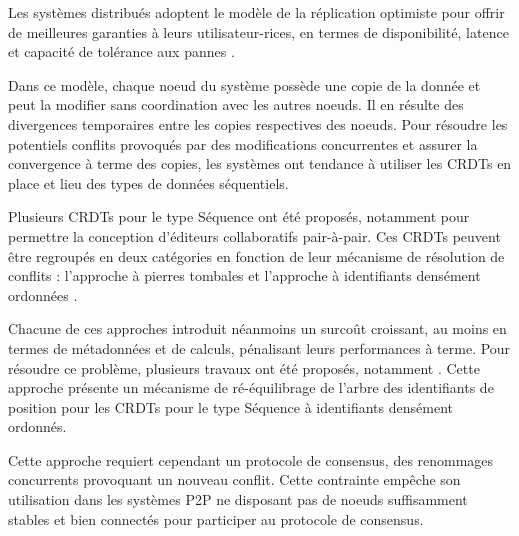 Les systèmes distribués adoptent le modèle de la réplication optimiste \cite{2005-optimistic-replication-saito} pour offrir de meilleures garanties à leurs utilisateur-rices, en termes de disponibilité, latence et capacité de tolérance aux pannes \cite{pacelc2012}.

Dans ce modèle, chaque noeud du système possède une copie de la donnée et peut la modifier sans coordination avec les autres noeuds.
Il en résulte des divergences temporaires entre les copies respectives des noeuds.
Pour résoudre les potentiels conflits provoqués par des modifications concurrentes et assurer la convergence à terme des copies, les systèmes ont tendance à utiliser les \acp{CRDT} \cite{shapiro_2011_crdt} en place et lieu des types de données séquentiels.

Plusieurs \acp{CRDT} pour le type Séquence ont été proposés, notamment pour permettre la conception d'éditeurs collaboratifs pair-à-pair.
Ces \acp{CRDT} peuvent être regroupés en deux catégories en fonction de leur mécanisme de résolution de conflits : l'approche à pierres tombales \cite{2006-woot-oster,2007-wooto-weiss,2011-evaluation-crdts-ahmed-nacer,ROH2011354,briot:hal-01343941,2019-interleaving-anomalies-collaborative-editors-kleppmann} et l'approche à identifiants densément ordonnées \cite{2009-treedoc-preguica,2009-logoot-weiss,2010-logoot-undo-weiss,2013-logootsplit,2021-these-vic}.

Chacune de ces approches introduit néanmoins un surcoût croissant, au moins en termes de métadonnées et de calculs, pénalisant leurs performances à terme.
Pour résoudre ce problème, plusieurs travaux ont été proposés, notamment \cite{letia:hal-01248270, zawirski:hal-01248197}.
Cette approche présente un mécanisme de ré-équilibrage de l'arbre des identifiants de position pour les \acp{CRDT} pour le type Séquence à identifiants densément ordonnés.

Cette approche requiert cependant un protocole de consensus, des renommages concurrents provoquant un nouveau conflit.
Cette contrainte empêche son utilisation dans les systèmes \ac{P2P} ne disposant pas de noeuds suffisamment stables et bien connectés pour participer au protocole de consensus.
